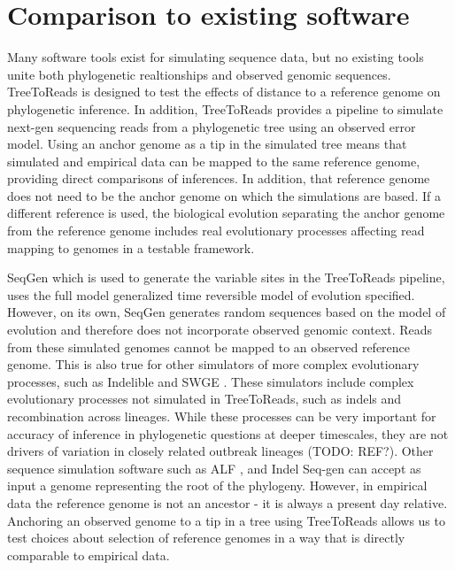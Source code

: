 \section*{Comparison to existing software}
Many software tools exist for simulating sequence data,
but no existing tools unite both phylogenetic realtionships and observed genomic sequences.
TreeToReads is designed to test the effects of distance to a reference genome on phylogenetic inference.
In addition, TreeToReads provides a pipeline to simulate next-gen sequencing reads from a phylogenetic tree using an observed error model.
Using an anchor genome as a tip in the simulated tree means that simulated and empirical data can be mapped to the same reference genome,
providing direct comparisons of inferences.
In addition, that reference genome does not need to be the anchor genome on which the simulations are based.
If a different reference is used, the biological evolution separating the anchor genome from the reference genome 
includes real evolutionary processes affecting read mapping to genomes in a testable framework. %

SeqGen \citep{rambaut_seq-gen:_1997} which is used to generate the variable sites in the TreeToReads pipeline, uses the full model generalized time reversible model of evolution specified.
However, on its own, SeqGen generates random sequences based on the model of evolution and therefore does not incorporate observed genomic context.
Reads from these simulated genomes cannot be mapped to an observed reference genome.
This is also true for other simulators of more complex evolutionary processes, such as Indelible \citep{fletcher_indelible:_2009} and SWGE \citep{arenas_simulation_2014}.
These simulators include complex evolutionary processes not simulated in TreeToReads, such as indels and recombination across lineages.
While these processes can be very important for accuracy of inference in phylogenetic questions at deeper timescales, they are not drivers of variation in closely related outbreak lineages (TODO: REF?).
Other sequence simulation software such as ALF \citep{dalquen_alfsimulation_2012}, and Indel Seq-gen \citep{strope_indel-seq-gen:_2007}
can accept as input a genome representing the root of the phylogeny.
However, in empirical data the reference genome is not an ancestor - it is always a present day relative.
Anchoring an observed genome to a tip in a tree using TreeToReads allows us to test choices about selection 
of reference genomes in a way that is directly comparable to empirical data.


